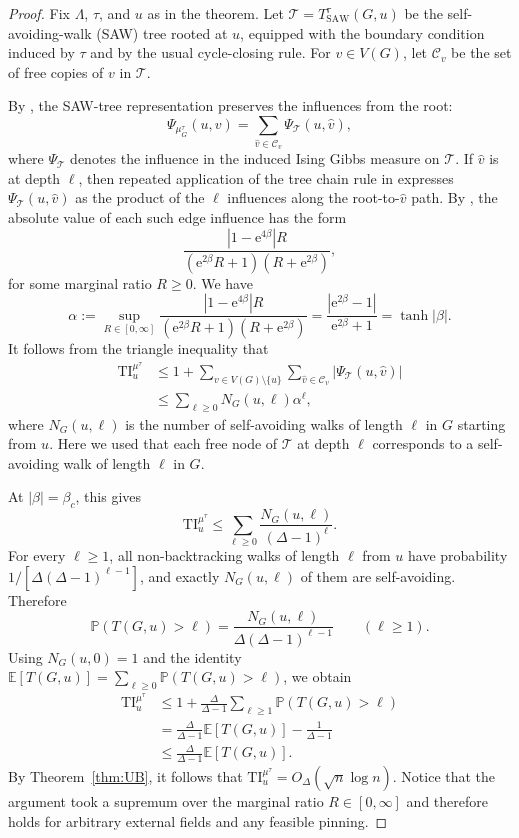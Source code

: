 \documentclass[11pt,a4paper]{article}
\theoremstyle{plain}
\renewcommand{\Pr}{\mathbb{P}}
\begin{document}
\begin{proof}
Fix $\Lambda$, $\tau$, and $u$ as in the theorem. 
Let $\mathcal T=T^\tau_{\mathrm{SAW}}(G,u)$ be the self-avoiding-walk (SAW) tree rooted at $u$, equipped with the boundary condition induced by $\tau$ and by the usual cycle-closing rule. 
For $v\in V(G)$, let $\mathcal C_v$ be the set of free copies of $v$ in $\mathcal T$.

By \cite[Lemma 13(2)]{chen2020contraction}, the SAW-tree representation preserves the influences from the root:
\[
\Psi_{\mu_G^\tau}(u,v)
 =\sum_{\widehat v\in\mathcal C_v}\Psi_{\mathcal T}(u,\widehat v),
\]
where $\Psi_{\mathcal T}$ denotes the influence in the induced Ising Gibbs measure on $\mathcal T$. If $\widehat v$ is at depth $\ell$, then repeated application of the tree chain rule in \cite[Lemma 15]{chen2020contraction} expresses $\Psi_{\mathcal T}(u,\widehat v)$ as the product of the $\ell$ influences along the root-to-$\widehat v$ path. By \cite[Lemma 16]{chen2020contraction}, the absolute value of each such edge influence has the form
\[
\frac{|1-\mathrm e^{4\beta}|R}
     {(\mathrm e^{2\beta}R+1)(R+\mathrm e^{2\beta})},
\]
for some marginal ratio $R\ge 0$.
We have
\[
\alpha:=\sup_{R\in[0,\infty]}
\frac{|1-\mathrm e^{4\beta}|R}
     {(\mathrm e^{2\beta}R+1)(R+\mathrm e^{2\beta})}
 =\frac{|\mathrm e^{2\beta}-1|}{\mathrm e^{2\beta}+1}=\tanh|\beta|.
\]
It follows from the triangle inequality that
\begin{align*}
\mathrm{TI}^{\mu^\tau}_u
&\le 1+\sum_{v\in V(G)\setminus\{u\}}
       \sum_{\widehat v\in\mathcal C_v}
       |\Psi_{\mathcal T}(u,\widehat v)|\\
&\le \sum_{\ell\ge0}N_G(u,\ell)\alpha^\ell,
\end{align*}
where $N_G(u,\ell)$ is the number of self-avoiding walks of length $\ell$ in $G$ starting from $u$. Here we used that each free node of $\mathcal T$ at depth $\ell$ corresponds to a self-avoiding walk of length $\ell$ in $G$.

At $|\beta|=\beta_c$, this gives
\[
\mathrm{TI}^{\mu^\tau}_u
 \le \sum_{\ell\ge0}\frac{N_G(u,\ell)}{(\Delta-1)^\ell}.
\]
For every $\ell\ge1$, all non-backtracking walks of length $\ell$ from $u$ have probability $1/[\Delta(\Delta-1)^{\ell-1}]$, and exactly $N_G(u,\ell)$ of them are self-avoiding. Therefore
\[
\Pr(T(G,u)>\ell)
 =\frac{N_G(u,\ell)}{\Delta(\Delta-1)^{\ell-1}}
 \qquad(\ell\ge1).
\]
Using $N_G(u,0)=1$ and the identity
$\mathbb E[T(G,u)]=\sum_{\ell\ge0}\Pr(T(G,u)>\ell)$, we obtain
\begin{align*}
\mathrm{TI}^{\mu^\tau}_u
&\le 1+\frac{\Delta}{\Delta-1}
       \sum_{\ell\ge1}\Pr(T(G,u)>\ell)\\
&=\frac{\Delta}{\Delta-1}\mathbb E[T(G,u)]
  -\frac{1}{\Delta-1}\\
&\le\frac{\Delta}{\Delta-1}\mathbb E[T(G,u)].
\end{align*}
By Theorem~\ref{thm:UB}, it follows that $\mathrm{TI}^{\mu^\tau}_u=O_\Delta(\sqrt{n}\log n)$.
Notice that the argument took a supremum over the marginal ratio $R\in[0,\infty]$ and therefore holds for arbitrary external fields and any feasible pinning.


\end{proof}
\end{document}
